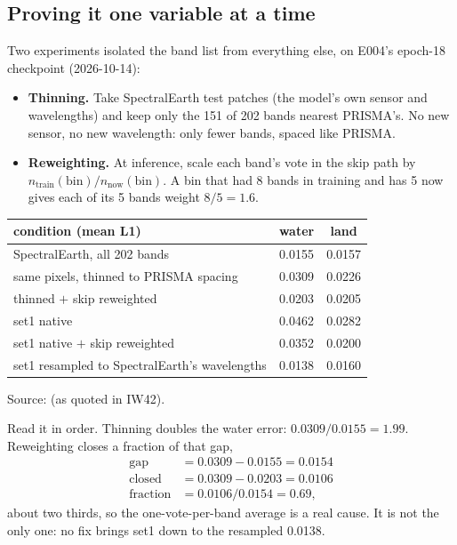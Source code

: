 
\subsection{Proving it one variable at a time}

Two experiments isolated the band list from everything else, on E004's epoch-18 checkpoint (2026-10-14):
\begin{itemize}
  \item \textbf{Thinning.} Take SpectralEarth test patches (the model's own sensor and wavelengths) and keep only the 151
    of 202 bands nearest PRISMA's. No new sensor, no new wavelength: only fewer bands, spaced like PRISMA.
  \item \textbf{Reweighting.} At inference, scale each band's vote in the skip path by $n_{\text{train}}(\text{bin}) /
    n_{\text{now}}(\text{bin})$. A bin that had 8 bands in training and has 5 now gives each of its 5 bands weight
    $8/5 = 1.6$.
\end{itemize}
\begin{center}
\begin{tabular}{lcc}
\toprule
condition (mean L1) & water & land\\
\midrule
SpectralEarth, all 202 bands & 0.0155 & 0.0157\\
same pixels, thinned to PRISMA spacing & 0.0309 & 0.0226\\
thinned $+$ skip reweighted & 0.0203 & 0.0205\\
set1 native & 0.0462 & 0.0282\\
set1 native $+$ skip reweighted & 0.0352 & 0.0200\\
set1 resampled to SpectralEarth's wavelengths & 0.0138 & 0.0160\\
\bottomrule
\end{tabular}
\end{center}
Source:\tbrk{} (as quoted in IW42).

Read it in order. Thinning doubles the water error: $0.0309 / 0.0155 = 1.99$. Reweighting closes a fraction of that gap,
\begin{align*}
  \text{gap} &= 0.0309 - 0.0155 = 0.0154\\
  \text{closed} &= 0.0309 - 0.0203 = 0.0106\\
  \text{fraction} &= 0.0106 / 0.0154 = 0.69,
\end{align*}
about two thirds, so the one-vote-per-band average is a real cause. It is not the only one: no fix brings set1 down to
the resampled 0.0138.

